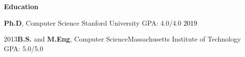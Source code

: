 \documentclass[10pt,A4]{article}
\newcommand{\cvsection}[1]
{
	\begin{center}
		\large\textcolor{sectcol}{\textbf{#1}}
	\end{center}
}
\newcommand{\cvevent}[5]
{

	\textbf{#2} \hspace{1mm} \textcolor{bgcol}{#3} \hfill \vspace{2.5pt}\textcolor{black}{#1}

\vspace{-8pt}
\textcolor{softcol}{\hrule}
\vspace{6pt}

  #4\\[3pt]
  #5\\[6pt]

}
\newcommand{\cvevtzeronohrulenobold}[4]
{

  #2 \hspace{1mm} \textcolor{bgcol}{#3} \hfill \vspace{2.5pt}\textcolor{black}{#1}

\vspace{-8pt}
\vspace{6pt}

}
\newcommand{\cvevtone}[4]
{

	\textbf{#2} \hspace{1mm} \textcolor{bgcol}{#3} \hfill \vspace{2.5pt}\textcolor{black}{#1}

\vspace{-8pt}
\vspace{6pt}

  #4\\[3pt]

}
\begin{document}
\vspace{-2mm}

\cvsection{Education}

\cvevtzeronohrulenobold{2019}{\textbf{Ph.D}, Computer Science}{\textcolor{sectcol}{\hspace{16mm} Stanford University} \hspace{32.5mm} GPA: 4.0/4.0}%



\cvevtzeronohrulenobold{2013}{\textbf{B.S.} and \textbf{M.Eng}, Computer Science}{\textcolor{sectcol}{Massachusetts Institute of Technology} \hspace{1mm} GPA: 5.0/5.0}\\ %

\vspace{2mm}


%


%


%


%
%
\end{document}
